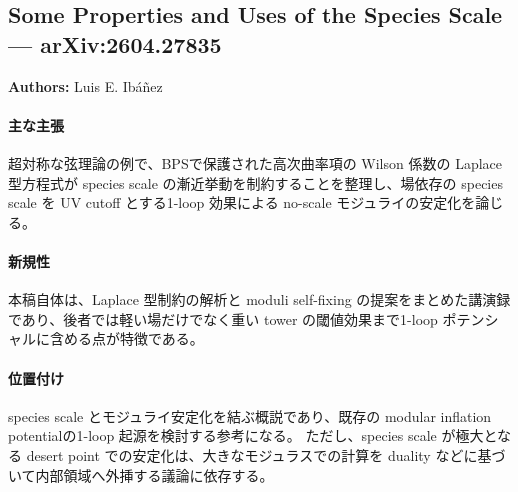 \subsection{Some Properties and Uses of the Species Scale --- arXiv:2604.27835}

\textbf{Authors:} Luis E. Ib\'a\~nez

\paragraph{主な主張}
超対称な弦理論の例で、BPSで保護された高次曲率項の Wilson 係数の Laplace 型方程式が species scale の漸近挙動を制約することを整理し、場依存の species scale を UV cutoff とする1-loop 効果による no-scale モジュライの安定化を論じる\cite{Ibanez:2026SpeciesProperties}。

\paragraph{新規性}
本稿自体は、Laplace 型制約の解析\cite{Aoufia:2025Laplacians}と moduli self-fixing の提案\cite{Casas:2025SelfFixing}をまとめた講演録であり、後者では軽い場だけでなく重い tower の閾値効果まで1-loop ポテンシャルに含める点が特徴である。

\paragraph{位置付け}
species scale とモジュライ安定化を結ぶ概説であり、既存の modular inflation potential\cite{Casas:2024species}の1-loop 起源を検討する参考になる。
ただし、species scale が極大となる desert point での安定化は、大きなモジュラスでの計算を duality などに基づいて内部領域へ外挿する議論に依存する。
